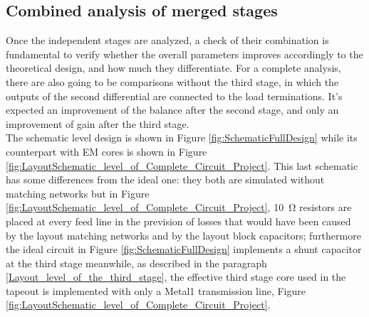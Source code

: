 \cleardoublepage
\subsection{Combined analysis of merged stages}
\label{sec:Combined_Analysis_of_merged_stages Analysis_combined_core}
%
Once the independent stages are analyzed, a check of their combination is fundamental to verify whether the overall parameters improves accordingly to the theoretical design, and how much they differentiate. 
For a complete analysis, there are also going to be comparisons without the third stage, in which the outputs of the second differential are connected to the load terminations.
It's expected an improvement of the balance after the second stage, and only an improvement of gain after the third stage.\\
The schematic level design is shown in Figure \ref{fig:SchematicFullDesign} while its counterpart with EM cores is shown in Figure \ref{fig:LayoutSchematic_level_of_Complete_Circuit_Project}. This last schematic has some differences from the ideal one: they both are simulated without matching networks but in Figure \ref{fig:LayoutSchematic_level_of_Complete_Circuit_Project}, \SI{10}{\ohm} resistors are placed at every feed line in the prevision of losses that would have been caused by the layout matching networks and by the layout block capacitors; furthermore the ideal circuit in Figure \ref{fig:SchematicFullDesign} implements a shunt capacitor at the third stage meanwhile, as described in the paragraph \ref{Layout_level_of_the_third_stage}, the effective third stage core used in the tapeout is implemented with only a Metal1 transmission line, Figure \ref{fig:LayoutSchematic_level_of_Complete_Circuit_Project}.

